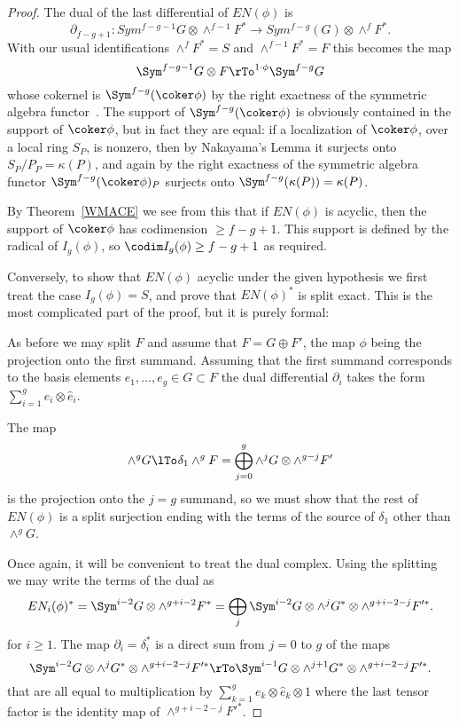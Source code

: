 \begin{proof}
The dual of the last differential of $EN(\phi)$ is
$$
\partial_{f-g+1}: Sym^{f-g-1}G \otimes \wedge^{f-1}F^{*} \to Sym^{f-g}(G) \otimes \wedge^{f}F^{*}.
$$ 
With our usual identifications $\wedge^{f}F^{*} = S$ and $\wedge^{f-1}F^{*} = F$ this becomes the map
$$
\Sym^{f-g-1}G \otimes F \rTo^{1\cdot \phi} \Sym^{f-g}G
$$
whose cokernel is $\Sym^{f-g}(\coker \phi)$ by the right exactness of the symmetric algebra functor~\cite[]{Eisenbud1995}. The support of $\Sym^{f-g}(\coker \phi)$ is obviously contained in the support
of $\coker \phi$, but in fact they are equal: if a localization of $\coker \phi$, over a local ring $S_{P}$,
 is nonzero, then by
Nakayama's Lemma it surjects onto $S_{P}/P_{P} = \kappa(P)$, and again by the right exactness
of the symmetric algebra functor $\Sym^{f-g}(\coker \phi)_{P}$ surjects onto $\Sym^{f-g}(\kappa(P)) = \kappa(P)$.

By Theorem~\ref{WMACE} we see from this that if $EN(\phi)$ is acyclic, then the support of $\coker \phi$
has codimension $\geq f-g+1$. This support is defined by the radical of $I_{g}(\phi)$, so $\codim I_{g}(\phi)\geq f-g+1$ as required.

Conversely, to show that $EN(\phi)$ acyclic under the given hypothesis we first treat the case
$I_{g}(\phi) = S$, and prove that $EN(\phi)^{*}$ is split exact. This is the most complicated part of the proof,
but it is purely formal:

As before we may split $F$ and
assume that $F = G\oplus F'$, the map $\phi$ being the projection onto the first summand.
Assuming that the first summand corresponds to the basis elements $e_{1}, \dots, e_{g}\in G\subset F$
the dual differential $\partial_{i}$ takes the form $\sum_{i=1}^{g} e_{i}\otimes \hat e_{i}$.

The map 
$$
\wedge^{g}G\lTo^{}{\delta_{1}} 
\wedge^{g}F =\bigoplus_{j=0}^{g}\wedge^{j}G\otimes \wedge^{g-j}F'
$$ 
is the projection onto the $j=g$ summand, so we must show that the rest of $EN(\phi)$ is a split surjection
ending with the terms of the source of $\delta_{1}$ other than $\wedge^{g}G$.

Once again, it will be convenient to treat the dual complex. Using the splitting
we may write the terms of the dual as
$$
EN_{i}(\phi)^{*} = \Sym^{i-2}G \otimes  \wedge^{g+i-2}F^{*}  = 
\bigoplus_{j} \Sym^{i-2}G \otimes  \wedge^{j}G^{*} \otimes \wedge^{g+i-2-j}F'^{*}.
$$
for $i\geq 1$.
The map $\partial_{i}= \delta_{i}^{*}$ is a direct sum from $j=0$ to $g$ of the maps 
$$
\Sym^{i-2}G \otimes  \wedge^{j}G^{*} \otimes \wedge^{g+i-2-j}F'^{*}
\rTo
\Sym^{i-1}G \otimes  \wedge^{j+1}G^{*} \otimes \wedge^{g+i-2-j}F'^{*}.
$$
that are all equal to  multiplication by $\sum_{k=1}^{g} e_{k}\otimes \hat e_{k}\otimes 1$
where the last tensor factor is the identity map of $\wedge^{g+i-2-j}F'^{*}$.


\end{proof}
